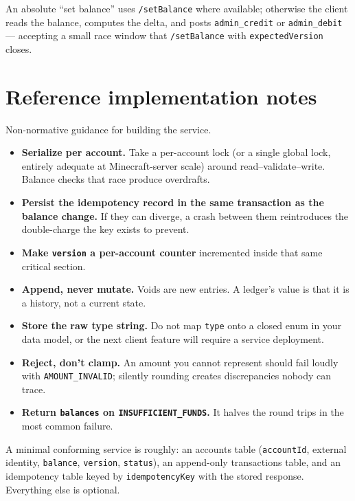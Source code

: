 \documentclass[11pt,a4paper]{article}
\newcommand{\code}[1]{\texttt{\small #1}}
\newcommand{\keybox}[2]{%
  \par\vspace{0.5em}\noindent
  \colorbox{#1}{%
    \begin{minipage}{\dimexpr\linewidth-2\fboxsep\relax}
    \vspace{0.35em}\small #2\vspace{0.35em}
    \end{minipage}}%
  \par\vspace{0.5em}}
\newcommand{\note}[1]{\keybox{omceWash}{#1}}
\begin{document}
An absolute ``set balance'' uses \code{/setBalance} where available; otherwise the client reads the
balance, computes the delta, and posts \code{admin\_credit} or \code{admin\_debit} --- accepting a
small race window that \code{/setBalance} with \code{expectedVersion} closes.

\section{Reference implementation notes}

Non-normative guidance for building the service.

\begin{itemize}
\item \textbf{Serialize per account.} Take a per-account lock (or a single global lock, entirely
      adequate at Minecraft-server scale) around read--validate--write. Balance checks that race
      produce overdrafts.
\item \textbf{Persist the idempotency record in the same transaction as the balance change.} If
      they can diverge, a crash between them reintroduces the double-charge the key exists to
      prevent.
\item \textbf{Make \code{version} a per-account counter} incremented inside that same critical
      section.
\item \textbf{Append, never mutate.} Voids are new entries. A ledger's value is that it is a
      history, not a current state.
\item \textbf{Store the raw type string.} Do not map \code{type} onto a closed enum in your data
      model, or the next client feature will require a service deployment.
\item \textbf{Reject, don't clamp.} An amount you cannot represent should fail loudly with
      \code{AMOUNT\_INVALID}; silently rounding creates discrepancies nobody can trace.
\item \textbf{Return \code{balances} on \code{INSUFFICIENT\_FUNDS}.} It halves the round trips in
      the most common failure.
\end{itemize}

\note{A minimal conforming service is roughly: an accounts table (\code{accountId}, external
identity, \code{balance}, \code{version}, \code{status}), an append-only transactions table, and an
idempotency table keyed by \code{idempotencyKey} with the stored response. Everything else is
optional.}
\end{document}
